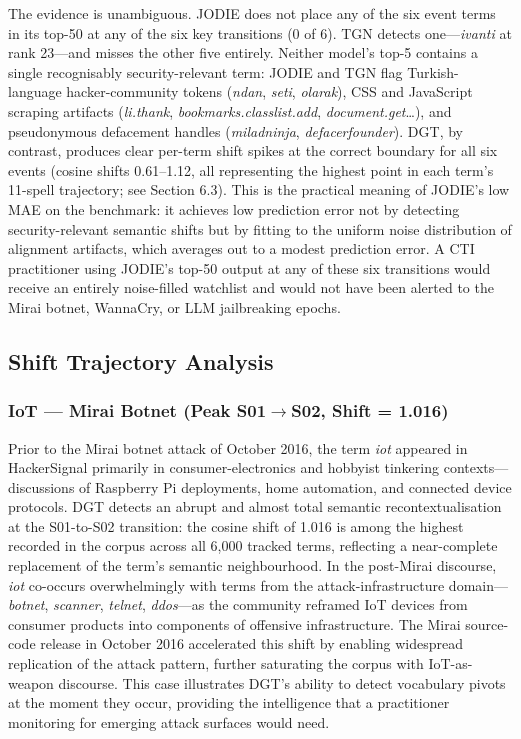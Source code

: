 \documentclass[12pt]{article}
\begin{document}
The evidence is unambiguous. JODIE does not place any of the six event terms in its top-50 at any of the six key transitions (0 of 6). TGN detects one---\textit{ivanti} at rank 23---and misses the other five entirely. Neither model's top-5 contains a single recognisably security-relevant term: JODIE and TGN flag Turkish-language hacker-community tokens (\textit{ndan}, \textit{seti}, \textit{olarak}), CSS and JavaScript scraping artifacts (\textit{li.thank}, \textit{bookmarks.classlist.add}, \textit{document.get}\ldots), and pseudonymous defacement handles (\textit{miladninja}, \textit{defacerfounder}). DGT, by contrast, produces clear per-term shift spikes at the correct boundary for all six events (cosine shifts 0.61--1.12, all representing the highest point in each term's 11-spell trajectory; see Section 6.3). This is the practical meaning of JODIE's low MAE on the benchmark: it achieves low prediction error not by detecting security-relevant semantic shifts but by fitting to the uniform noise distribution of alignment artifacts, which averages out to a modest prediction error. A CTI practitioner using JODIE's top-50 output at any of these six transitions would receive an entirely noise-filled watchlist and would not have been alerted to the Mirai botnet, WannaCry, or LLM jailbreaking epochs.

\subsection{Shift Trajectory Analysis}

\subsubsection{IoT --- Mirai Botnet (Peak S01$\rightarrow$S02, Shift = 1.016)}

Prior to the Mirai botnet attack of October 2016, the term \textit{iot} appeared in HackerSignal primarily in consumer-electronics and hobbyist tinkering contexts---discussions of Raspberry Pi deployments, home automation, and connected device protocols. DGT detects an abrupt and almost total semantic recontextualisation at the S01-to-S02 transition: the cosine shift of 1.016 is among the highest recorded in the corpus across all 6,000 tracked terms, reflecting a near-complete replacement of the term's semantic neighbourhood. In the post-Mirai discourse, \textit{iot} co-occurs overwhelmingly with terms from the attack-infrastructure domain---\textit{botnet}, \textit{scanner}, \textit{telnet}, \textit{ddos}---as the community reframed IoT devices from consumer products into components of offensive infrastructure. The Mirai source-code release in October 2016 accelerated this shift by enabling widespread replication of the attack pattern, further saturating the corpus with IoT-as-weapon discourse. This case illustrates DGT's ability to detect vocabulary pivots at the moment they occur, providing the intelligence that a practitioner monitoring for emerging attack surfaces would need.
\end{document}
